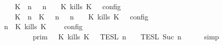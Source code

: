 \begin{isabellebody}
\ \ \ \ {\isacharequal}\ {\isasymlbrakk}\ {\isacharparenleft}{\isacharparenleft}K\ {\isasymnot}{\isasymUp}\ n{\isacharparenright}\ {\isacharhash}\ {\isasymGamma}{\isacharparenright}{\isacharcomma}\ n\ {\isasymturnstile}\ {\isasymPsi}\ {\isasymtriangleright}\ {\isacharparenleft}{\isacharparenleft}K\ kills\ K\ {\isacharhash}\ {\isasymPhi}{\isacharparenright}\ {\isasymrbrakk}\isactrlsub c\isactrlsub o\isactrlsub n\isactrlsub f\isactrlsub i\isactrlsub g\isanewline
\ \ \ \ {\isasymunion}\ {\isasymlbrakk}\ {\isacharparenleft}{\isacharparenleft}K\ {\isasymUp}\ n{\isacharparenright}\ {\isacharhash}\ {\isacharparenleft}K\ {\isasymnot}{\isasymUp}\ {\isasymge}\ n{\isacharparenright}\ {\isacharhash}\ {\isasymGamma}{\isacharparenright}{\isacharcomma}\ n\ {\isasymturnstile}\ {\isasymPsi}\ {\isasymtriangleright}\ {\isacharparenleft}{\isacharparenleft}K\ kills\ K\ {\isacharhash}\ {\isasymPhi}{\isacharparenright}\ {\isasymrbrakk}\isactrlsub c\isactrlsub o\isactrlsub n\isactrlsub f\isactrlsub i\isactrlsub g{\isacartoucheclose}\isanewline
%
\isadelimproof
%
\endisadelimproof
%
\isatagproof
{}\isamarkupfalse%
\ {\isacharminus}\isanewline
\ \ \isamarkupfalse%
\ {\isacartoucheopen}{\isasymlbrakk}\ {\isasymGamma}{\isacharcomma}\ n\ {\isasymturnstile}\ {\isacharparenleft}{\isacharparenleft}K\ kills\ K\ {\isacharhash}\ {\isasymPsi}{\isacharparenright}\ {\isasymtriangleright}\ {\isasymPhi}\ {\isasymrbrakk}\isactrlsub c\isactrlsub o\isactrlsub n\isactrlsub f\isactrlsub i\isactrlsub g\isanewline
\ \ \ \ \ \ \ \ {\isacharequal}\ {\isasymlbrakk}{\isasymlbrakk}\ {\isasymGamma}\ {\isasymrbrakk}{\isasymrbrakk}\isactrlsub p\isactrlsub r\isactrlsub i\isactrlsub m\ {\isasyminter}\ {\isasymlbrakk}{\isasymlbrakk}\ {\isacharparenleft}K\ kills\ K\ {\isacharhash}\ {\isasymPsi}\ {\isasymrbrakk}{\isasymrbrakk}\isactrlsub T\isactrlsub E\isactrlsub S\isactrlsub L\isactrlbsup {\isasymge}\ n\isactrlesup \ {\isasyminter}\ {\isasymlbrakk}{\isasymlbrakk}\ {\isasymPhi}\ {\isasymrbrakk}{\isasymrbrakk}\isactrlsub T\isactrlsub E\isactrlsub S\isactrlsub L\isactrlbsup {\isasymge}\ Suc\ n\isactrlesup {\isacartoucheclose}\isanewline
\ \ \ \ \isamarkupfalse%
\ simp\isanewline
\ \ \isamarkupfalse%

\end{isabellebody}
